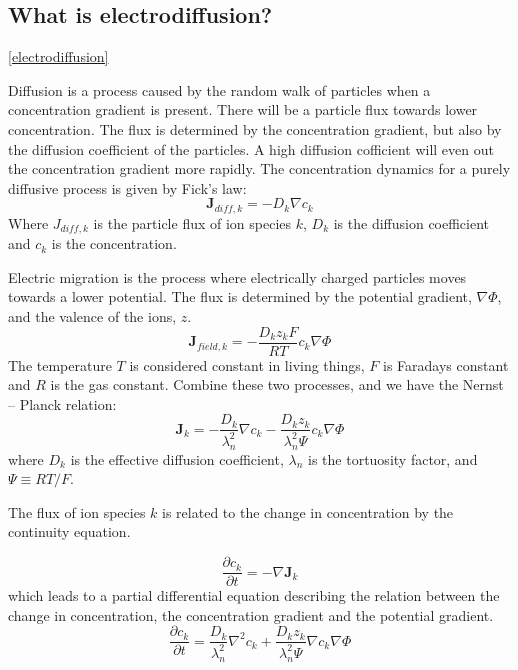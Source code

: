 \documentclass{article}
\begin{document}
\subsection{What is electrodiffusion?}\ref{electrodiffusion}

Diffusion is a process caused by the random walk of particles when a concentration gradient is present. There will be a particle flux towards lower concentration. The flux is determined by the concentration gradient, but also by the diffusion coefficient of the particles. A high diffusion cofficient will even out the concentration gradient more rapidly. The concentration dynamics for a purely diffusive process is given by Fick's law:
\begin{equation}\label{eq:diff}
 \bm{J}_{diff,k} = - D_k\nabla c_k
\end{equation}
Where  $J_{diff,k}$ is the particle flux of ion species $k$, $D_k$ is the diffusion coefficient and $c_k$ is the concentration.

Electric migration is the process where electrically charged particles moves towards a lower potential. The flux is determined by the potential gradient, $\nabla \Phi$,  and the valence of the ions, $z$. 
\begin{equation}
\bm{J}_{field,k} = -\frac{D_kz_kF}{RT} c_k\nabla \Phi
\end{equation}
The temperature $T$ is considered constant in living things, $F$ is Faradays constant and $R$ is the gas constant. Combine these two processes, and we have the Nernst -- Planck relation:
 \begin{equation}\label{eq:nernst-planck}
\bm{J}_k = -\frac{D_k}{\lambda_n^2}\nabla c_k -\frac{D_k z_k}{\lambda_n^2 \Psi}c_k  \nabla \Phi
\end{equation}
where $D_k$ is the effective diffusion coefficient, $\lambda_n$ is the tortuosity factor, and $\Psi \equiv RT/F$.

The flux  of ion species $k$ is related to the change in concentration by the continuity equation. 

\begin{equation}
\frac{\partial c_k}{\partial t} = -\nabla \bm{J}_k
\end{equation}
which leads to a partial differential equation describing the relation between the change in concentration, the concentration gradient and the potential gradient.
 \begin{equation}\label{eq:el-diff}
\frac{\partial c_k}{\partial t}  = \frac{D_k}{\lambda_n^2}\nabla^2 c_k +\frac{D_k z_k}{\lambda_n^2 \Psi}\nabla c_k  \nabla \Phi
\end{equation}
\end{document}
